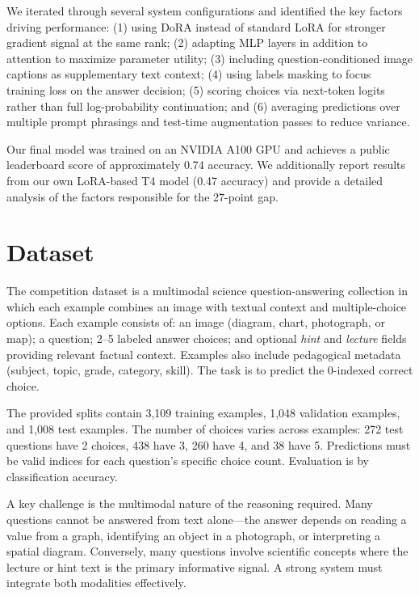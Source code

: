 \documentclass[11pt]{article}
\begin{document}
We iterated through several system configurations and identified the key factors driving performance: (1) using DoRA instead of standard LoRA for stronger gradient signal at the same rank; (2) adapting MLP layers in addition to attention to maximize parameter utility; (3) including question-conditioned image captions as supplementary text context; (4) using labels masking to focus training loss on the answer decision; (5) scoring choices via next-token logits rather than full log-probability continuation; and (6) averaging predictions over multiple prompt phrasings and test-time augmentation passes to reduce variance.

Our final model was trained on an NVIDIA A100 GPU and achieves a public leaderboard score of approximately 0.74 accuracy. We additionally report results from our own LoRA-based T4 model (0.47 accuracy) and provide a detailed analysis of the factors responsible for the 27-point gap.

\section{Dataset}

The competition dataset is a multimodal science question-answering collection in which each example combines an image with textual context and multiple-choice options. Each example consists of: an image (diagram, chart, photograph, or map); a question; 2--5 labeled answer choices; and optional \textit{hint} and \textit{lecture} fields providing relevant factual context. Examples also include pedagogical metadata (subject, topic, grade, category, skill). The task is to predict the 0-indexed correct choice.

The provided splits contain 3,109 training examples, 1,048 validation examples, and 1,008 test examples. The number of choices varies across examples: 272 test questions have 2 choices, 438 have 3, 260 have 4, and 38 have 5. Predictions must be valid indices for each question's specific choice count. Evaluation is by classification accuracy.

A key challenge is the multimodal nature of the reasoning required. Many questions cannot be answered from text alone---the answer depends on reading a value from a graph, identifying an object in a photograph, or interpreting a spatial diagram. Conversely, many questions involve scientific concepts where the lecture or hint text is the primary informative signal. A strong system must integrate both modalities effectively.
\end{document}

